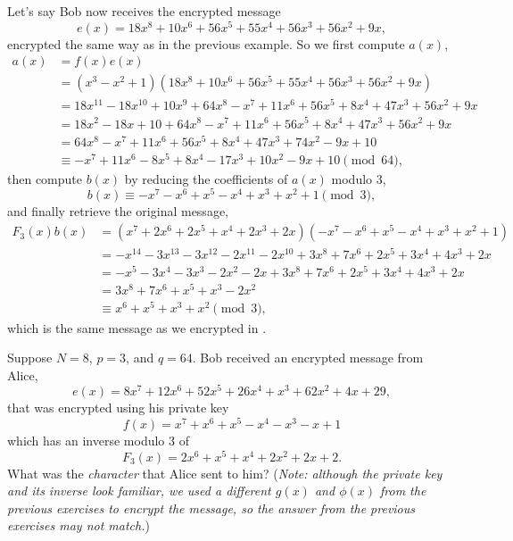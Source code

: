 \begin{example}
    Let's say Bob now receives the encrypted message
    \[
        e(x) = 18x^8 + 10x^6 + 56x^5 + 55x^4 + 56x^3 + 56x^2 + 9x,
    \]
    encrypted the same way as in the previous example. So we first compute $a(x)$,
    \begin{align*}
        a(x) &= f(x)e(x)\\
        &= (x^3 - x^2 + 1)(18x^8 + 10x^6 + 56x^5 + 55x^4 + 56x^3 + 56x^2 + 9x)\\
        &= 18x^{11} - 18x^{10} + 10x^9 + 64x^8 - x^7 + 11x^6 + 56x^5 + 8x^4 + 47x^3 + 56x^2 + 9x\\
        &= 18x^2 - 18x + 10 + 64x^8 - x^7 + 11x^6 + 56x^5 + 8x^4 + 47x^3 + 56x^2 + 9x\\
        &= 64x^8 - x^7 + 11x^6 + 56x^5 + 8x^4 + 47x^3 + 74x^2 - 9x + 10\\
        &\equiv -x^7 + 11x^6 - 8x^5 + 8x^4 - 17x^3 + 10x^2 - 9x + 10 \pmod{64},
    \end{align*}
    then compute $b(x)$ by reducing the coefficients of $a(x)$ modulo 3,
    \[
        b(x) \equiv -x^7 - x^6 + x^5 - x^4 + x^3 + x^2 + 1 \pmod{3},
    \]
    and finally retrieve the original message,
    \begin{align*}
        F_3(x)b(x) &= (x^7 + 2x^6 + 2x^5 +x^4 + 2x^3 + 2x)(-x^7 - x^6 + x^5 - x^4 + x^3 + x^2 + 1)\\
        &= -x^{14} - 3x^{13} - 3x^{12} - 2x^{11} - 2x^{10} + 3x^8 + 7x^6 + 2x^5 + 3x^4 + 4x^3 + 2x\\
        &= -x^5 - 3x^4 - 3x^3 - 2x^2 - 2x + 3x^8 + 7x^6 + 2x^5 + 3x^4 + 4x^3 + 2x\\
        &= 3x^8 + 7x^6 + x^5 + x^3 - 2x^2\\
        &\equiv x^6 + x^5 + x^3 + x^2 \pmod{3},
    \end{align*}
    which is the same message as we encrypted in .
\end{example}

\begin{exercise}
    Suppose $N = 8$, $p = 3$, and $q = 64$. Bob received an encrypted message from Alice,
    \[
        e(x) = 8x^7 + 12x^6 + 52x^5 + 26x^4 +x^3 + 62x^2 + 4x + 29,
    \]
    that was encrypted using his private key
    \[
        f(x) = x^7 +x^6 +x^5 -x^4 -x^3 -x + 1
    \]
    which has an inverse modulo 3 of
    \[
        F_3(x) = 2x^6 +x^5 +x^4 + 2x^2 + 2x + 2.
    \]
    What was the \textit{character} that Alice sent to him?\newline
    (\textit{Note: although the private key and its inverse look familiar, we used a different $g(x)$ and $\phi(x)$ from the previous exercises to encrypt the message, so the answer from the previous exercises may not match.})
\end{exercise}

